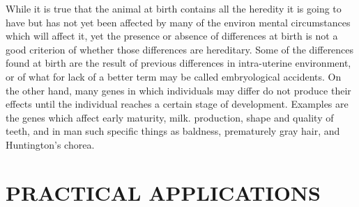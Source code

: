 While it is true that the animal at birth contains all the heredity it is
going to have but has not yet been affected by many of the environ mental
circumstances which will affect it, yet the presence or absence of
differences at birth is not a good criterion of whether those differences
are hereditary. Some of the differences found at birth are the result of
previous differences in intra-uterine environment, or of what for lack
of a better term may be called embryological accidents. On the other
hand, many genes in which individuals may differ do not produce their
effects until the individual reaches a certain stage of development.
Examples are the genes which affect early maturity, milk. production,
shape and quality of teeth, and in man such specific things as baldness,
prematurely gray hair, and Huntington's chorea.

\section*{PRACTICAL APPLICATIONS}

